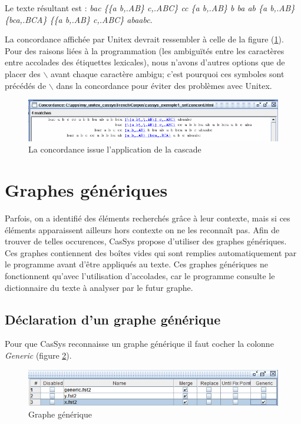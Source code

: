 \bigskip
\noindent Le texte résultant est : \emph{bac \{\{a b,.AB\} c,.ABC\} cc \{a b,.AB\} b ba ab \{a
b,.AB\} \{bca,.BCA\} \{\{a b,.AB\} c,.ABC\} abaabc}.


\bigskip
\noindent La concordance affichée par Unitex devrait ressembler à celle de la figure
(\ref{fig13-07}). Pour des raisons liées à la programmation (les ambiguïtés entre les
	caractères entre accolades des étiquettes lexicales), nous n'avons d'autres options que de
placer des  $\backslash$ avant chaque caractère ambigu; c'est pourquoi ces symboles sont précédés de
$\backslash$ dans la concordance pour éviter des problèmes avec Unitex.

\begin{figure}[!htb]
  \centering
  \includegraphics[width=15cm]{resources/img/fig13-07.png}
  \caption{La concordance issue l'application de la cascade}
  \label{fig13-07}
\end{figure}

\section{Graphes g\'{e}n\'{e}riques}

Parfois, on a identifi\'{e} des \'{e}l\'{e}ments recherch\'{e}s gr\^{a}ce \`{a} leur contexte, mais si ces \'{e}l\'{e}ments apparaissent ailleurs hors contexte on ne les reconna\^{i}t pas. Afin de trouver de telles occurences, CasSys propose d'utiliser des graphes g\'{e}n\'{e}riques. Ces graphes contiennent des bo\^{i}tes vides qui sont remplies automatiquement par le programme avant d'\^{e}tre appliqu\'{e}s au texte. Ces graphes g\'{e}n\'{e}riques ne fonctionnent qu'avec l'utilisation d'accolades, car le programme consulte le dictionnaire du texte \`{a} analyser par le futur graphe.

\subsection{D\'{e}claration d'un graphe g\'{e}n\'{e}rique}
Pour que CasSys reconnaisse un graphe g\'{e}n\'{e}rique il faut cocher la colonne \emph{Generic} (figure \ref{fig12-3}).
\begin{figure}[!htb]
  \centering
  \includegraphics[width=15cm]{resources/img/fig12-3.png}
  \caption{Graphe g\'{e}n\'{e}rique}
  \label{fig12-3}
\end{figure}

